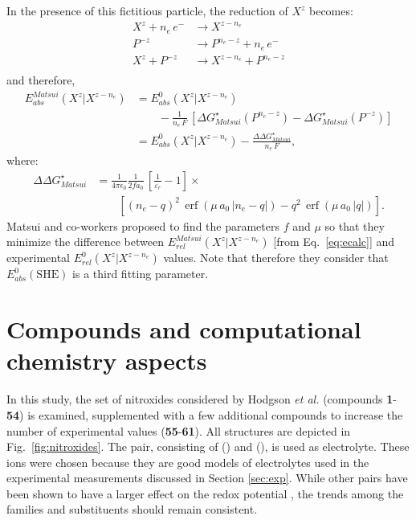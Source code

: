 \documentclass[review,preprint]{elsarticle}
\DeclareMathOperator{\erf}{erf}
\begin{document}
In the presence of this fictitious particle, the reduction of $X^z$ becomes:\begin{equation*}
	\begin{array}{rl}
		X^z + n_e\,e^- &\rightarrow X^{z-n_e} \\
		P^{-z} \phantom{ + n_e\,e^-} &\rightarrow P^{n_e-z} + n_e\,e^- \\
		\hline
		X^z + P^{-z}&\rightarrow X^{z-n_e} +P^{n_e-z}\\
	\end{array}  \label{eq:corr}
\end{equation*}
and therefore,\begin{align}
	E^{Matsui}_{abs}(X^z|X^{z-n_e}) &= 	E_{abs}^0(X^{z}|X^{z-n_e})\nonumber\\
	&\hspace{2em}-\frac{1}{n_e\,F}\,[\Delta G^\star_{Matsui}(P^{n_e-z}) - \Delta G^\star_{Matsui}(P^{-z})] \nonumber\\
	&= 	E_{abs}^0(X^{z}|X^{z-n_e}) -\frac{\Delta\Delta G^\star_{Matsui}}{n_e\,F}, \label{eq:matsui} 
\end{align}
where:\begin{align*}
	\Delta\Delta G^\star_{Matsui}&=\frac{1}{4\pi\epsilon_0}\frac{1}{2fa_0}\,\left[\frac{1}{\varepsilon_r}-1\right]\times\nonumber\\
	&\hspace{2em}\left[ (n_e-q)^2\,\erf(\mu\,a_0\,|n_e-q|)-q^2\,\erf(\mu\,a_0\,|q|)\right].
\end{align*}
Matsui and co-workers proposed to  find the parameters $f$ and $\mu$ so that they minimize the difference between $E^{Matsui}_{rel}(X^z|X^{z-n_e})$  [from Eq.~\eqref{eq:ecalc}] and experimental $E^0_{rel}(X^z|X^{z-n_e})$ values.  Note that therefore they consider that $ E^{0}_{abs}(\text{SHE})$ is a third fitting parameter.

\section{Compounds and computational chemistry aspects} \label{sec:methodo}

In this study, the set of nitroxides considered by Hodgson \textit{et al.} (compounds \textbf{1}-\textbf{54}) is examined, supplemented with a few additional compounds to increase the number of experimental values (\textbf{55}-\textbf{61}). All structures are depicted in Fig.~\ref{fig:nitroxides}. The  pair, consisting of  () and  (), is used as electrolyte. These ions were chosen because they are good models of electrolytes used in the experimental measurements discussed in Section \ref{sec:exp}. While other pairs have been shown to have a larger effect on the redox potential \cite{wylieImprovedPerformanceAllOrganic2019a}, the trends among the families and substituents should remain consistent.
\end{document}
